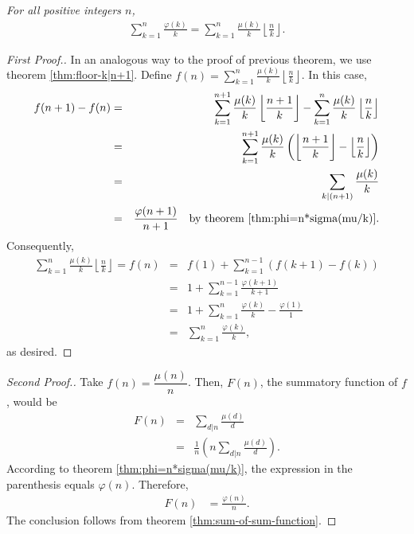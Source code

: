 \documentclass[12pt]{subfile}
\begin{document}
		\begin{theorem}\slshape
			For all positive integers $n$,
				\begin{align*}
					\sum_{k=1}^{n} \frac{\varphi(k)}{k} = \sum_{k=1}^{n} \frac{\mu(k)}{k} \left\lfloor \frac{n}{k} \right\rfloor.
				\end{align*}
		\end{theorem}
		
		\begin{proof}[First Proof.]
			In an analogous way to the proof of previous theorem, we use theorem \eqref{thm:floor-k|n+1}. Define $f(n)= \sum\limits_{k=1}^{n} \frac{\mu(k)}{k} \left\lfloor \frac{n}{k} \right\rfloor$. In this case,
				\begin{eqnarray*}
					f(n+1)-f(n) &=& \sum_{k=1}^{n+1} \frac{\mu(k)}{k} \left\lfloor \frac{n+1}{k} \right\rfloor - \sum_{k=1}^{n} \frac{\mu(k)}{k} \left\lfloor \frac{n}{k} \right\rfloor\\
								&=& \sum_{k=1}^{n+1} \frac{\mu(k)}{k} \left(\left\lfloor \frac{n+1}{k} \right\rfloor - \left\lfloor \frac{n}{k} \right\rfloor\right)\\
								&=& \sum_{k|(n+1)} \frac{\mu(k)}{k}\\
								&=& \frac{\varphi(n+1)}{n+1} \quad \mbox{by theorem \eqref{thm:phi=n*sigma(mu/k)}}.
				\end{eqnarray*}
			Consequently,
				\begin{eqnarray*}
					\sum\limits_{k=1}^{n} \frac{\mu(k)}{k} \left\lfloor \frac{n}{k} \right\rfloor = f(n) 
						&=& f(1) + \sum_{k=1}^{n-1} \left(f(k+1)-f(k)\right)\\
						&=& 1 + \sum_{k=1}^{n-1} \frac{\varphi(k+1)}{k+1}\\
						&=& 1 + \sum_{k=1}^{n} \frac{\varphi(k)}{k} - \frac{\varphi(1)}{1}\\
						&=& \sum_{k=1}^{n} \frac{\varphi(k)}{k},
				\end{eqnarray*}
			as desired.
		\end{proof}
		
		\begin{proof}[Second Proof.]
			Take $f(n)= \dfrac{\mu(n)}{n}$. Then, $F(n)$, the summatory function of $f$, would be
				\begin{eqnarray*}
					F(n) &=& \sum_{d|n} \frac{\mu(d)}{d} \\
						 &=& \frac{1}{n} \left(n\sum_{d|n} \frac{\mu(d)}{d}\right).
				\end{eqnarray*}
			According to theorem \eqref{thm:phi=n*sigma(mu/k)}, the expression in the parenthesis equals $\varphi(n)$. Therefore,
				\begin{align*}
					F(n) &= \frac{\varphi(n)}{n}.
				\end{align*}
			The conclusion follows from theorem \eqref{thm:sum-of-sum-function}.
		\end{proof}
		
\end{document}
